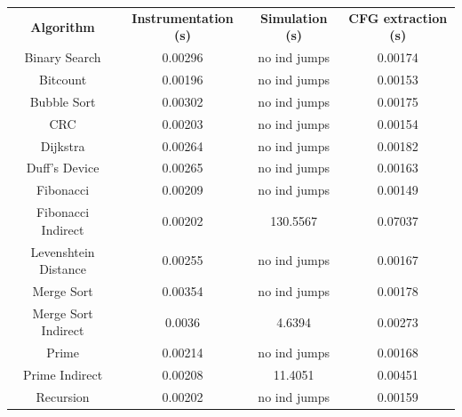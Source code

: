 \begin{table}
  \centering
  \begin{tabular}{|c|c|c|c|}
    \hline
    \textbf{Algorithm}          & \textbf{Instrumentation (s)} & \textbf{Simulation (s)} & \textbf{CFG extraction (s)} \\
    \hhline{====} Binary Search & 0.00296                      & no ind jumps            & 0.00174                     \\
    \hline
    Bitcount                    & 0.00196                      & no ind jumps            & 0.00153                     \\
    \hline
    Bubble Sort                 & 0.00302                      & no ind jumps            & 0.00175                     \\
    \hline
    CRC                         & 0.00203                      & no ind jumps            & 0.00154                     \\
    \hline
    Dijkstra                    & 0.00264                      & no ind jumps            & 0.00182                     \\
    \hline
    Duff's Device               & 0.00265                      & no ind jumps            & 0.00163                     \\
    \hline
    Fibonacci                   & 0.00209                      & no ind jumps            & 0.00149                     \\
    \hline
    Fibonacci Indirect          & 0.00202                      & 130.5567                & 0.07037                     \\
    \hline
    Levenshtein Distance        & 0.00255                      & no ind jumps            & 0.00167                     \\
    \hline
    Merge Sort                  & 0.00354                      & no ind jumps            & 0.00178                     \\
    \hline
    Merge Sort Indirect         & 0.0036                       & 4.6394                  & 0.00273                     \\
    \hline
    Prime                       & 0.00214                      & no ind jumps            & 0.00168                     \\
    \hline
    Prime Indirect              & 0.00208                      & 11.4051                 & 0.00451                     \\
    \hline
    Recursion                   & 0.00202                      & no ind jumps            & 0.00159                     \\

\end{tabular}
\end{table}
